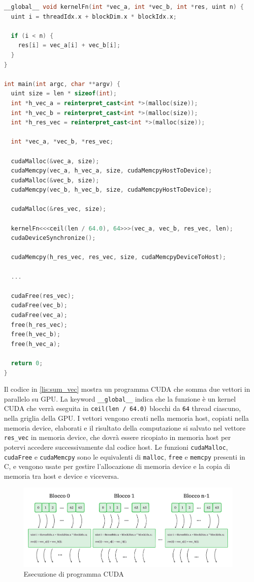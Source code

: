 \newpage
\vspace{5mm}
\begin{lstlisting}[language=C++, caption=Somma di vettori in CUDA, label=lis:sum_vec]
__global__ void kernelFn(int *vec_a, int *vec_b, int *res, uint n) {
  uint i = threadIdx.x + blockDim.x * blockIdx.x;

  if (i < n) {
    res[i] = vec_a[i] + vec_b[i];
  }
}

int main(int argc, char **argv) {
  uint size = len * sizeof(int);
  int *h_vec_a = reinterpret_cast<int *>(malloc(size));
  int *h_vec_b = reinterpret_cast<int *>(malloc(size));
  int *h_res_vec = reinterpret_cast<int *>(malloc(size));

  int *vec_a, *vec_b, *res_vec;

  cudaMalloc(&vec_a, size);
  cudaMemcpy(vec_a, h_vec_a, size, cudaMemcpyHostToDevice);
  cudaMalloc(&vec_b, size);
  cudaMemcpy(vec_b, h_vec_b, size, cudaMemcpyHostToDevice);

  cudaMalloc(&res_vec, size);

  kernelFn<<<ceil(len / 64.0), 64>>>(vec_a, vec_b, res_vec, len);
  cudaDeviceSynchronize();

  cudaMemcpy(h_res_vec, res_vec, size, cudaMemcpyDeviceToHost);

  ...

  cudaFree(res_vec);
  cudaFree(vec_b);
  cudaFree(vec_a);
  free(h_res_vec);
  free(h_vec_b);
  free(h_vec_a);

  return 0;
}
\end{lstlisting}
\vspace{5mm}

Il codice in \ref{lis:sum_vec} mostra un programma CUDA che somma due vettori in parallelo su GPU. La keyword \verb|__global__| indica che la funzione è un kernel CUDA che verrà eseguita in \verb|ceil(len / 64.0)| blocchi da \verb|64| thread ciascuno, nella griglia della GPU. I vettori vengono creati nella memoria host, copiati nella memoria device, elaborati e il risultato della computazione si salvato nel vettore \verb|res_vec| in memoria device, che dovrà essere ricopiato in memoria host per potervi accedere successivamente dal codice host. Le funzioni \verb|cudaMalloc|, \verb|cudaFree| e \verb|cudaMemcpy| sono le equivalenti di \verb|malloc|, \verb|free| e \verb|memcpy| presenti in C, e vengono usate per gestire l'allocazione di memoria device e la copia di memoria tra host e device e viceversa.

\begin{figure}[ht]
    \centering
    \includegraphics[width=.9\linewidth]{images/chapter2/grid.png}
    \caption{Esecuzione di programma CUDA}
    \label{fig:grid}
\end{figure}

